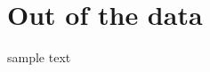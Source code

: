 \documentclass[book.tex]{subfiles}
\begin{document}
\part{Out of the data}
sample text
\end{document}
